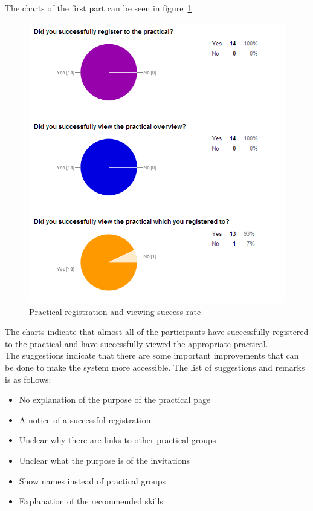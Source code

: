 The charts of the first part can be seen in figure~\ref{register_practical_chart}\\
\begin{figure}[h]
    \centering
    \includegraphics[width=\textwidth]{images/register_practical_chart}
    \caption{Practical registration and viewing success rate}
    \label{register_practical_chart}
\end{figure}

The charts indicate that almost all of the participants have successfully registered to the practical and have successfully viewed the appropriate practical.\\

The suggestions indicate that there are some important improvements that can be done to make the system more accessible.
The list of suggestions and remarks is as follows:
\begin{itemize}
\item No explanation of the purpose of the practical page
\item A notice of a successful registration
\item Unclear why there are links to other practical groups
\item Unclear what the purpose is of the invitations
\item Show names instead of practical groups
\item Explanation of the recommended skills
\end{itemize}

